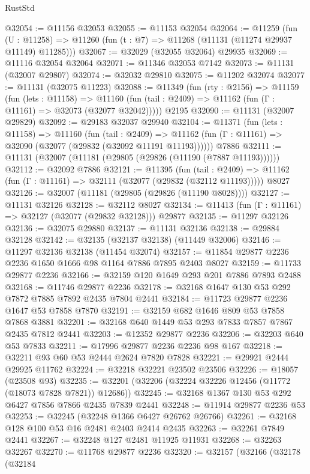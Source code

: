 \begin{lexlean}{RustStd}
\begin{coremodule}
@32054 := @11156 @32053
@32055 := @11153 @32054
@32064 := @11259
    (fun (U : @11258) => @11260 (fun (t : @7) => @11268 (@11131 (@11274 @29937 @11149) @11285)))
@32067 := @32029 (@32055 @32064) @29935
@32069 := @11116 @32054 @32064
@32071 := @11346 @32053 @7142
@32073 := @11131 (@32007 @29807)
@32074 := @32032 @29810
@32075 := @11202 @32074
@32077 := @11131 (@32075 @11223)
@32088 := @11349
    (fun (rty : @2156) =>
    @11159
      (fun (lets : @11158) =>
      @11160 (fun (tail : @2409) => @11162 (fun (Γ : @11161) => @32073 (@32077 @32042)))))
    @2195
@32090 := @11131 (@32007 @29829)
@32092 := @29183 @32037 @29940
@32104 := @11371
    (fun (lets : @11158) =>
    @11160
      (fun (tail : @2409) =>
      @11162 (fun (Γ : @11161) => @32090 (@32077 (@29832 (@32092 @11191 @11193))))))
    @7886
@32111 := @11131 (@32007 (@11181 (@29805 (@29826 (@11190 (@7887 @11193))))))
@32112 := @32092 @7886
@32121 := @11395
    (fun (tail : @2409) => @11162 (fun (Γ : @11161) => @32111 (@32077 (@29832 (@32112 @11193)))))
    @8027
@32126 := @32007 (@11181 (@29805 (@29826 (@11190 @8028))))
@32127 := @11131 @32126
@32128 := @32112 @8027
@32134 := @11413 (fun (Γ : @11161) => @32127 (@32077 (@29832 @32128))) @29877
@32135 := @11297 @32126
@32136 := @32075 @29880
@32137 := @11131 @32136
@32138 := @29884 @32128
@32142 := @32135 (@32137 @32138) (@11449 @32006)
@32146 := @11297 @32136 @32138 (@11454 @32074)
@32157 := @11854 @29877 @2236 @2236 @1650 @1666 @98 @1164 @7886 @7895 @2403 @8027
@32159 := @11733 @29877 @2236
@32166 := @32159 @120 @1649 @293 @201 @7886 @7893 @2488
@32168 := @11746 @29877 @2236
@32178 := @32168 @1647 @130 @53 @292 @7872 @7885 @7892 @2435 @7804 @2441
@32184 := @11723 @29877 @2236 @1647 @53 @7858 @7870
@32191 := @32159 @682 @1646 @809 @53 @7858 @7868 @3881
@32201 := @32168 @640 @1449 @53 @293 @7833 @7857 @7867 @2435 @7812 @2441
@32203 := @12352 @29877 @2236
@32206 := @32203 @640 @53 @7833
@32211 := @17996 @29877 @2236 @2236 @98 @167
@32218 := @32211 @93 @60 @53 @2444 @2624 @7820 @7828
@32221 := @29921 @2444 @29925 @11762
@32224 := @32218 @32221 @23502 @23506
@32226 := @18057 (@23508 @93)
@32235 := @32201 (@32206 (@32224 @32226 @12456 (@11772 (@18073 @7828 @7821)) @12686))
@32245 := @32168 @1367 @130 @53 @292 @6427 @7856 @7866 @2435 @7839 @2441
@32248 := @11914 @29877 @2236 @53
@32253 := @32245 (@32248 @1366 @6427 @26762 @26766)
@32261 := @32168 @128 @100 @53 @16 @2481 @2403 @2414 @2435
@32263 := @32261 @7849 @2441
@32267 := @32248 @127 @2481 @11925 @11931
@32268 := @32263 @32267
@32270 := @11768 @29877 @2236
@32320 := @32157
    (@32166
      (@32178
        (@32184

\end{coremodule}
\end{lexlean}
